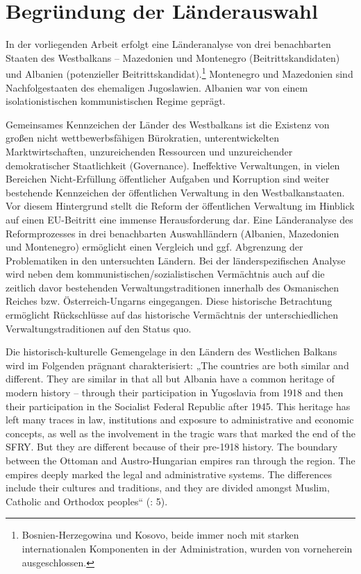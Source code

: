 \section{Begründung der Länderauswahl}
In der vorliegenden Arbeit erfolgt eine Länderanalyse von drei benachbarten Staaten des Westbalkans – Mazedonien und Montenegro (Beitrittskandidaten) und Albanien (potenzieller Beitrittskandidat).\footnote{Bosnien-Herzegowina und Kosovo, beide immer noch mit starken internationalen Komponenten in der Administration, wurden von vorneherein ausgeschlossen.} Montenegro und Mazedonien sind Nachfolgestaaten des ehemaligen Jugoslawien. Albanien war von einem isolationistischen kommunistischen Regime geprägt.
\par
Gemeinsames Kennzeichen der Länder des Westbalkans ist die Existenz von großen nicht wettbewerbsfähigen Bürokratien, unterentwickelten Marktwirtschaften, unzureichenden Ressourcen und unzureichender demokratischer Staatlichkeit (Governance). Ineffektive Verwaltungen, in vielen Bereichen Nicht-Erfüllung öffentlicher Aufgaben und Korruption sind weiter bestehende Kennzeichen der öffentlichen Verwaltung in den Westbalkanstaaten. Vor diesem Hintergrund stellt die Reform der öffentlichen Verwaltung im Hinblick auf einen EU-Beitritt eine immense Herausforderung dar.
Eine Länderanalyse des Reformprozesses in drei benachbarten Auswahlländern (Albanien, Mazedonien und Montenegro) ermöglicht einen Vergleich und ggf. Abgrenzung der Problematiken in den untersuchten Ländern. Bei der länderspezifischen Analyse wird neben dem kommunistischen/sozialistischen Vermächtnis auch auf die zeitlich davor bestehenden Verwaltungstraditionen innerhalb des Osmanischen Reiches bzw. Österreich-Ungarns eingegangen. Diese historische Betrachtung ermöglicht Rückschlüsse auf das historische Vermächtnis der unterschiedlichen Verwaltungstraditionen auf den Status quo.\par
Die historisch-kulturelle Gemengelage in den Ländern des Westlichen Balkans wird im Folgenden prägnant charakterisiert: „The countries are both similar and different. They are similar in that all but Albania have a common heritage of modern history -- through their participation in Yugoslavia from 1918 and then their participation in the Socialist Federal Republic after 1945. This heritage has left many traces in law, institutions and exposure to administrative and economic concepts, as well as the involvement in the tragic wars that marked the end of the SFRY. But they are different because of their pre-1918 history. The boundary between the Ottoman and Austro-Hungarian empires ran through the region. The empires deeply marked the legal and administrative systems. The differences include their cultures and traditions, and they are divided amongst Muslim, Catholic and Orthodox peoples“ (\cite{oecd04}: 5).\par
